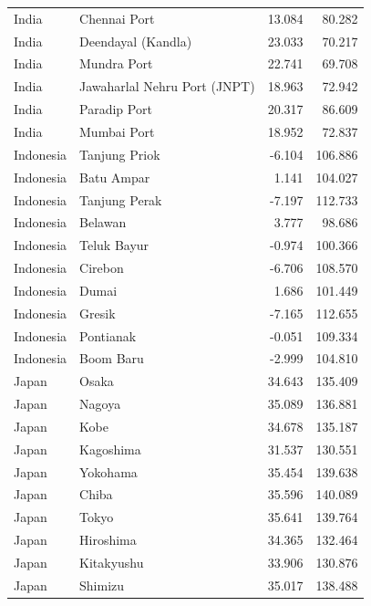 \documentclass[11pt]{article}
\begin{document}
\begin{table}[htbp]
{\begin{tabular}{llrr}
India & Chennai Port & 13.084 & 80.282 \\
India & Deendayal (Kandla) & 23.033 & 70.217 \\
India & Mundra Port & 22.741 & 69.708 \\
India & Jawaharlal Nehru Port (JNPT) & 18.963 & 72.942 \\
India & Paradip Port & 20.317 & 86.609 \\
India & Mumbai Port & 18.952 & 72.837 \\
Indonesia & Tanjung Priok & -6.104 & 106.886 \\
Indonesia & Batu Ampar & 1.141 & 104.027 \\
Indonesia & Tanjung Perak & -7.197 & 112.733 \\
Indonesia & Belawan & 3.777 & 98.686 \\
Indonesia & Teluk Bayur & -0.974 & 100.366 \\
Indonesia & Cirebon & -6.706 & 108.570 \\
Indonesia & Dumai & 1.686 & 101.449 \\
Indonesia & Gresik & -7.165 & 112.655 \\
Indonesia & Pontianak & -0.051 & 109.334 \\
Indonesia & Boom Baru & -2.999 & 104.810 \\
Japan & Osaka & 34.643 & 135.409 \\
Japan & Nagoya & 35.089 & 136.881 \\
Japan & Kobe & 34.678 & 135.187 \\
Japan & Kagoshima & 31.537 & 130.551 \\
Japan & Yokohama & 35.454 & 139.638 \\
Japan & Chiba & 35.596 & 140.089 \\
Japan & Tokyo & 35.641 & 139.764 \\
Japan & Hiroshima & 34.365 & 132.464 \\
Japan & Kitakyushu & 33.906 & 130.876 \\
Japan & Shimizu & 35.017 & 138.488 \\
\bottomrule
\end{tabular}
}
\end{table}
\end{document}
